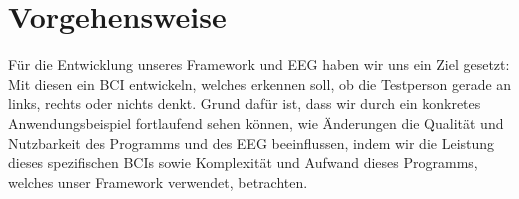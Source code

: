 \documentclass[10pt]{article}
\begin{document}
\begin{itemize}
\end{itemize}
 
\section{Vorgehensweise}

Für die Entwicklung unseres Framework und EEG haben wir uns ein Ziel gesetzt: Mit diesen ein BCI entwickeln, welches erkennen soll, ob die Testperson gerade an links, rechts oder nichts denkt.
Grund dafür ist, dass wir durch ein konkretes Anwendungsbeispiel fortlaufend sehen können, wie Änderungen die Qualität und Nutzbarkeit des Programms und des EEG beeinflussen, indem wir die Leistung dieses spezifischen BCIs sowie Komplexität und Aufwand dieses Programms, welches unser Framework verwendet, betrachten.
\end{document}
